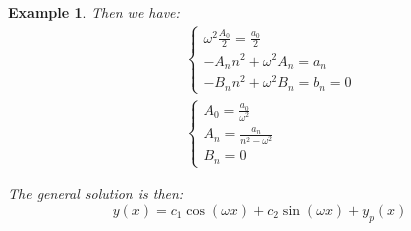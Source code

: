 \documentclass{article}
\newtheorem{example}{Example}[section]
\begin{document}
\begin{enumerate}
\begin{example}
              Then we have:
              \begin{eqnarray}
                  && \begin{cases}
                      \omega^2 \frac{A_{0}}{2} = \frac{a_{0}}{2} \\
                      -A_{n} n^2 + \omega^2 A_{n} = a_{n}        \\
                      -B_{n} n^2 + \omega^2 B_{n} = b_{n} = 0
                  \end{cases}
                  \\
                  && \begin{cases}
                      A_{0} = \frac{a_{0}}{\omega^2}       \\
                      A_{n} = \frac{a_{n}}{n^2 - \omega^2} \\
                      B_{n} = 0
                  \end{cases}
              \end{eqnarray}

              The general solution is then:
              \begin{equation}
                  y(x) = c_1 \cos(\omega x) + c_2 \sin(\omega x) + y_p(x)
              \end{equation}
          \end{example}
\end{enumerate}
\end{document}
